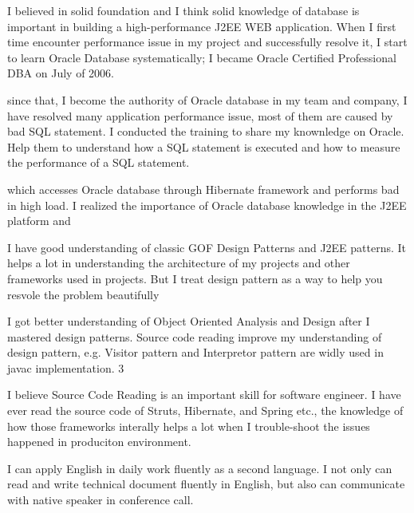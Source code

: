 \par
I believed in solid foundation and I think solid knowledge of database is
 important in building a high-performance J2EE WEB application. 
When I first time encounter performance issue in my project and successfully resolve it,
 I start to learn Oracle Database systematically; 
I became Oracle Certified Professional DBA on July of 2006. 

since that, I become the authority of Oracle database in my team and company, 
I have resolved many application
performance issue, most of them are caused by bad SQL statement. I conducted the training
to share my knownledge on Oracle. Help them to understand how a SQL statement is executed and
how to measure the performance of a SQL statement.

which accesses Oracle database through Hibernate framework and performs bad in high load. I realized the importance of Oracle database knowledge in the J2EE platform and  


I have good understanding of classic GOF Design Patterns and J2EE patterns. 
It helps a lot in understanding the architecture of my projects and other 
frameworks used in projects. But I treat design pattern as a way to help you resvole the problem beautifully

I got better understanding of Object Oriented Analysis and Design after I mastered design patterns. Source code reading improve my understanding of design pattern, e.g. Visitor pattern and Interpretor pattern are widly used in javac implementation.
3
    
\par
I believe Source Code Reading is an important skill for software engineer.
I have ever read the source code of Struts, Hibernate, and Spring etc., 
the knowledge of how those frameworks interally helps a lot when I trouble-shoot 
the issues happened in produciton environment.


\par
I can apply English in daily work fluently as a second language. 
I not only can read and write technical document fluently in English, 
but also can communicate with native speaker in conference call.

